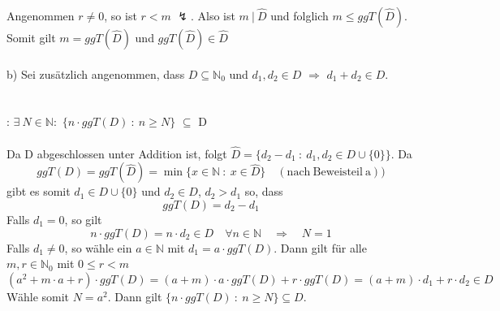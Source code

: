 Angenommen $r \neq 0$, so ist $r<m$ $\lightning$. Also ist $m \: | \: \hat{D}$ und folglich $m \leq ggT(\hat{D})$. Somit gilt $m=ggT(\hat{D})$ und $ggT(\hat{D}) \in \hat{D}$
\\
\\
b) Sei zusätzlich angenommen, dass $D \subseteq \mathbb{N}_{0}$ und $d_{1}, d_{2} \in D$ $\Rightarrow$ $d_{1} + d_{2} \in D$.\\
\\
\\
: $\exists \: N \in \mathbb{N}:$ $\lbrace
 n \cdot ggT(D) \: : \: n \geq N \rbrace$ $\subseteq$ D
\\
\\
Da D abgeschlossen unter Addition ist, folgt $\hat{D} = \lbrace d_{2} - d_{1} \: : \: d_{1},d_{2} \in D \cup \lbrace 0 \rbrace \rbrace$. Da
\begin{equation*}
ggT(D) = ggT(\hat{D}) = \min \lbrace x \in \mathbb{N} \: : \: x \in \hat{D} \rbrace \quad (\mathrm{nach \: Beweisteil \: a}))
\end{equation*}
gibt es somit $d_{1} \in D \cup \lbrace 0 \rbrace$ und $d_{2} \in D$, $d_{2} > d_{1}$ so, dass
\begin{equation*}
ggT(D) = d_{2} - d_{1}
\end{equation*}
Falls $d_{1} = 0$, so gilt
\begin{equation*}
n \cdot ggT(D) = n \cdot d_{2} \in D \quad \forall n \in \mathbb{N} \quad \Rightarrow \quad N=1
\end{equation*}
Falls $d_{1} \neq 0$, so wähle ein $a \in \mathbb{N}$ mit $d_{1} = a \cdot ggT(D)$. Dann gilt für alle $m,r \in \mathbb{N}_{0}$ mit $0 \leq r < m$
\begin{equation*}
(a^{2} + m \cdot a +r)\cdot ggT(D) = (a+m)\cdot a \cdot ggT(D) + r \cdot ggT(D) = (a+m) \cdot d_{1} + r \cdot d_{2} \in D
\end{equation*}
Wähle somit $N = a^{2}$. Dann gilt $\lbrace n \cdot ggT(D) \: : \: n \geq N \rbrace \subseteq D.$ 